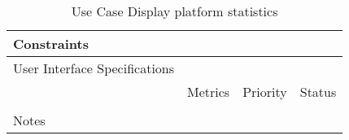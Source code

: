 \begin{table}[H]
\begin{tabularx}{\linewidth}{|l|X|X|X|}
    \hline Constraints                   & \multicolumn{3}{l|}{}                                                                                 \\

    \hline User Interface Specifications & \multicolumn{3}{l|}{}                                                                                 \\

    \hline \multirow{2}{*}{}             & Metrics                                                                           & Priority & Status \\
    \cline{2-4}                          &                                                                                   &          &        \\
    \hline Notes                         & \multicolumn{3}{l|}{}                                                                                 \\
    \hline
  \end{tabularx}
  \caption{Use Case Display platform statistics}
  \label{tab:use_case_display_platform_statistics}
\end{table}

